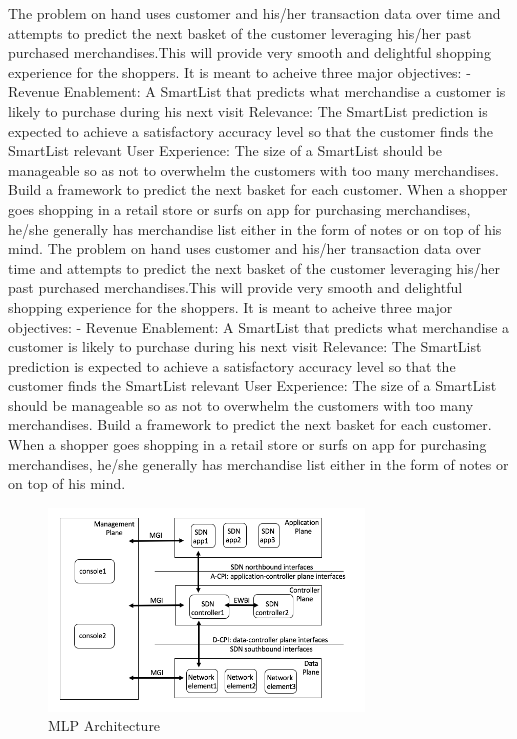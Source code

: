 The problem on hand uses customer and his/her transaction data over time and attempts to predict 
the next basket of the customer leveraging his/her past purchased merchandises.This will provide 
very smooth and delightful shopping experience for the shoppers. It is meant to acheive three major 
objectives: - Revenue Enablement: A SmartList that predicts what merchandise a customer is likely to 
purchase during his next visit Relevance: The SmartList prediction is expected to achieve a 
satisfactory accuracy level so that the customer finds the SmartList relevant User Experience: 
The size of a SmartList should be manageable so as not to overwhelm the customers with too many 
merchandises. Build a framework to predict the next basket for each customer.
When a shopper goes shopping in a retail store or surfs on app for purchasing merchandises, 
he/she generally has merchandise list either in the form of notes or on top of his mind. 
The problem on hand uses customer and his/her transaction data over time and attempts to predict 
the next basket of the customer leveraging his/her past purchased merchandises.This will provide 
very smooth and delightful shopping experience for the shoppers. It is meant to acheive three major 
objectives: - Revenue Enablement: A SmartList that predicts what merchandise a customer is likely to 
purchase during his next visit Relevance: The SmartList prediction is expected to achieve a 
satisfactory accuracy level so that the customer finds the SmartList relevant User Experience: 
The size of a SmartList should be manageable so as not to overwhelm the customers with too many 
merchandises. Build a framework to predict the next basket for each customer.
When a shopper goes shopping in a retail store or surfs on app for purchasing merchandises, 
he/she generally has merchandise list either in the form of notes or on top of his mind. 

\begin{figure}[t]
  \centering 
  \includegraphics[width=3.3in]{img/MLP.png} 
  \caption{MLP Architecture} 
  \label{fig:MLP} 
\end{figure}

